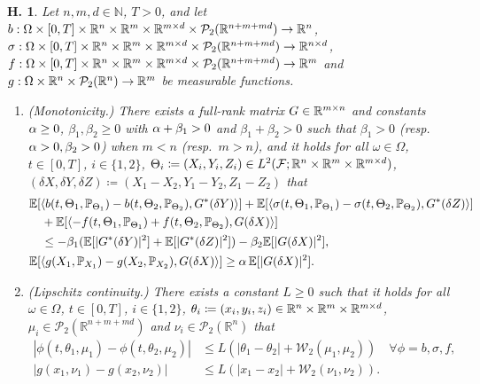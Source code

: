 \documentclass[11pt]{article}
\numberwithin{equation}{section}
\newtheorem{Assumption}{H.\!\!}
\theoremstyle{definition}
\theoremstyle{remark}
\def\to{\rightarrow}
\def\Om{\Omega}  \def\om{\omega} %
\newcommand{\q}{\quad}   \newcommand{\qq}{\qquad}
\def\l{\label}  \def\f{\frac}  \def\fa{\forall}
\def \la{\langle} \def\ra{\rangle}
\def\cF{\mathcal{F}}
\def\cP{\mathcal{P}}
\def\cW{\mathcal{W}}
\def\sE{{\mathbb{E}}}
\def\sN{{\mathbb{N}}}
\def\sP{\mathbb{P}}
\def\sR{{\mathbb R}}
\begin{document}
\begin{Assumption}\l{assum:fbsde_discrete_exp}
Let $n,m,d\in \sN$,
$T>0$,
and let
$b:\Om\t [0,T]\t \sR^n\t \sR^m\t \sR^{m\t d}\t \cP_2(\sR^{n+m+md})\to \sR^n $,
$\sigma:\Om\t [0,T] \t \sR^n\t \sR^m\t \sR^{m\t d}\t \cP_2(\sR^{n+m+md})\to \sR^{n\t d} $,
$f:\Om\t [0,T]\t \sR^n\t \sR^m\t \sR^{m\t d}\t \cP_2(\sR^{n+m+md})\to \sR^{m} $
and 
$g:\Om\t \sR^n\t \cP_2(\sR^{n})\to \sR^{m}$
be measurable functions.
\begin{enumerate}[(1)]
\item{(Monotonicity.)}\l{item:monotone_exp}
There exists 
a full-rank matrix $G\in \sR^{m\t n}$
and
constants
 $\alpha\ge 0$,
  $\beta_1,\beta_2\ge 0$ 
with 
$\alpha+\beta_1>0$ and
$\beta_1+\beta_2>0$
such that
$\beta_1>0$ (resp.~$\alpha>0,\beta_2>0$) 
 when $m<n$ (resp.~$m>n$),
and
it holds
for all $\omega\in \Om$, $t\in [0,T]$, $i\in \{1,2\}$, 
 $\Theta_i\coloneqq (X_i,Y_i,Z_i)\in L^2(\cF; \sR^n\t \sR^m\t \sR^{m\t d})$,
 $(\delta X,\delta Y,\delta Z) \coloneqq (X_1-X_2,Y_1-Y_2,Z_1-Z_2)$
 that
\begin{align*}
&\sE[\la b(t,\Theta_1,\sP_{\Theta_1})-b(t,\Theta_2,\sP_{\Theta_2}), G^*(\delta Y)\ra]
+\sE[\la \sigma(t,\Theta_1,\sP_{\Theta_1})-\sigma(t,\Theta_2,\sP_{\Theta_2}), G^*(\delta  Z)\ra]
\\
&\quad + \sE[\la -f(t,\Theta_1,\sP_{\Theta_1})+f(t,\Theta_2,\sP_{\Theta_2}), G(\delta X)\ra]
\\
&\quad \le -\beta_1(\sE[|G^*(\delta Y)|^2]+\sE[|G^*(\delta Z)|^2]) -\beta_2\sE[|G(\delta X)|^2],
\\
&\sE[\la g(X_1,\sP_{X_1})-g(X_2,\sP_{X_2}), G(\delta X)\ra]
\ge  \a\,\sE[|G(\delta X)|^2].
\end{align*}


% 
 
 
 \item{(Lipschitz continuity.)}\l{item:lipschitz_exp}
There exists a constant $L\ge 0$ such that
it holds
 for all 
$\omega\in \Om$, $t\in [0,T]$,
$i\in \{1,2\}$, $\theta_i\coloneqq (x_i,y_i,z_i)\in  \sR^n\t \sR^m\t \sR^{m\t d}$,
 $\mu_i\in \cP_2(\sR^{n+m+md})$
and  $\nu_i\in \cP_2(\sR^n)$  that
\begin{align*}
|\phi(t,\theta_1,\mu_1)-\phi(t,\theta_2,\mu_2)|
&\le L(|\theta_1-\theta_2|+\cW_2(\mu_1,\mu_2))
\q \forall \phi=b,\sigma,f,
\\
|g(x_1,\nu_1)-g(x_2,\nu_2)|
&\le L(|x_1-x_2|+\cW_2(\nu_1,\nu_2)).
\end{align*}



\end{enumerate}
\end{Assumption}
\end{document}
